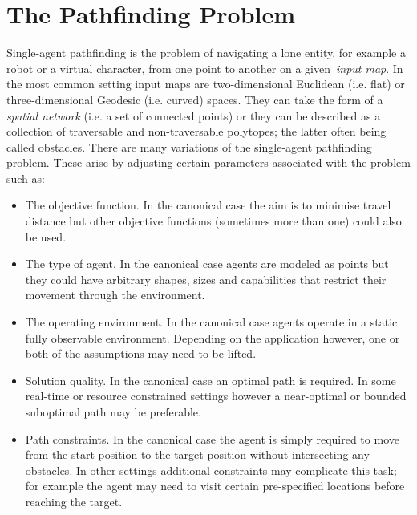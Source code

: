 \section{The Pathfinding Problem}
\label{cha::lit::problem}
Single-agent pathfinding is the problem of navigating a lone entity, for example
a robot or a virtual character, from one point to another on a given~\emph{input
map}.  In the most common setting input maps are two-dimensional Euclidean (i.e.
flat) or three-dimensional Geodesic (i.e.  curved) spaces. They can take the
form of a \emph{spatial network} (i.e. a set of connected points) or they can be
described as a collection of traversable and non-traversable polytopes; the
latter often being called obstacles.
There are many variations of the single-agent pathfinding problem. These arise
by adjusting certain parameters associated with the problem such as:
\begin{itemize}
\item The objective function. In the canonical case the aim is to minimise 
travel distance but other objective functions (sometimes more than one)
could also be used.
\item The type of agent. In the canonical case agents are modeled as points
but they could have arbitrary shapes, sizes and capabilities that 
restrict their movement through the environment.
\item The operating environment. In the canonical case agents operate in a 
static fully observable environment. Depending on the application however, one 
or both of the assumptions may need to be lifted.
\item Solution quality. In the canonical case an optimal path is required. 
In some real-time or resource constrained settings however a near-optimal 
or bounded suboptimal path may be preferable.
\item Path constraints. In the canonical case  the agent is simply required 
to move from the start position to the target position without intersecting
any obstacles. In other settings additional constraints may complicate this
task; for example the agent may need to visit certain pre-specified locations 
before reaching the target.
\end{itemize}

